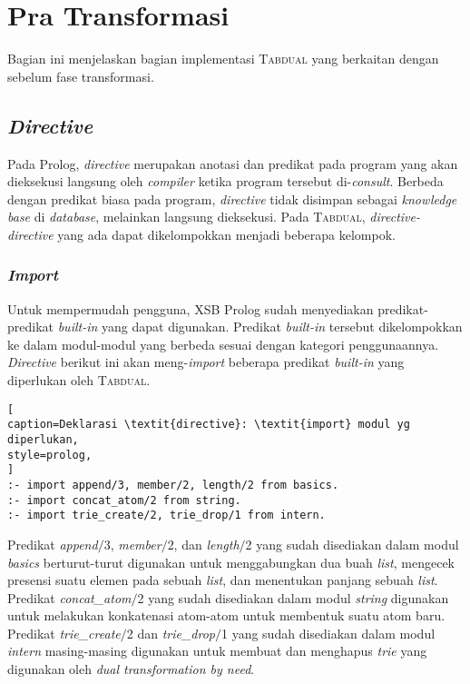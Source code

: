\section{Pra Transformasi}

Bagian ini menjelaskan bagian implementasi \textsc{Tabdual} yang berkaitan dengan sebelum fase transformasi.

\subsection{\textit{Directive}}

Pada Prolog, \textit{directive} merupakan anotasi dan predikat pada program yang akan dieksekusi langsung oleh \textit{compiler} ketika program tersebut di-\textit{consult}. Berbeda dengan predikat biasa pada program, \textit{directive} tidak disimpan sebagai \textit{knowledge base} di \textit{database}, melainkan langsung dieksekusi. Pada \textsc{Tabdual}, \textit{directive-directive} yang ada dapat dikelompokkan menjadi beberapa kelompok.

\subsubsection{\textit{Import}}

Untuk mempermudah pengguna, XSB Prolog sudah menyediakan predikat-predikat \textit{built-in} yang dapat digunakan. Predikat \textit{built-in} tersebut dikelompokkan ke dalam modul-modul yang berbeda sesuai dengan kategori penggunaannya. \textit{Directive} berikut ini akan meng-\textit{import} beberapa predikat \textit{built-in} yang diperlukan oleh \textsc{Tabdual}.
\\

\begin{lstlisting}[
caption=Deklarasi \textit{directive}: \textit{import} modul yg diperlukan,
style=prolog,
]
:- import append/3, member/2, length/2 from basics.
:- import concat_atom/2 from string.
:- import trie_create/2, trie_drop/1 from intern.
\end{lstlisting}

Predikat \textit{append$/$}3, \textit{member$/$}2, dan \textit{length$/$}2 yang sudah disediakan dalam modul \textit{basics} berturut-turut digunakan untuk menggabungkan dua buah \textit{list}, mengecek presensi suatu elemen pada sebuah \textit{list}, dan menentukan panjang sebuah \textit{list}. Predikat \textit{concat\_atom$/$}2 yang sudah disediakan dalam modul \textit{string} digunakan untuk melakukan konkatenasi atom-atom untuk membentuk suatu atom baru. Predikat \textit{trie\_create$/$}2 dan \textit{trie\_drop$/$}1 yang sudah disediakan dalam modul \textit{intern} masing-masing digunakan untuk membuat dan menghapus \textit{trie} yang digunakan oleh \textit{dual transformation by need}.

